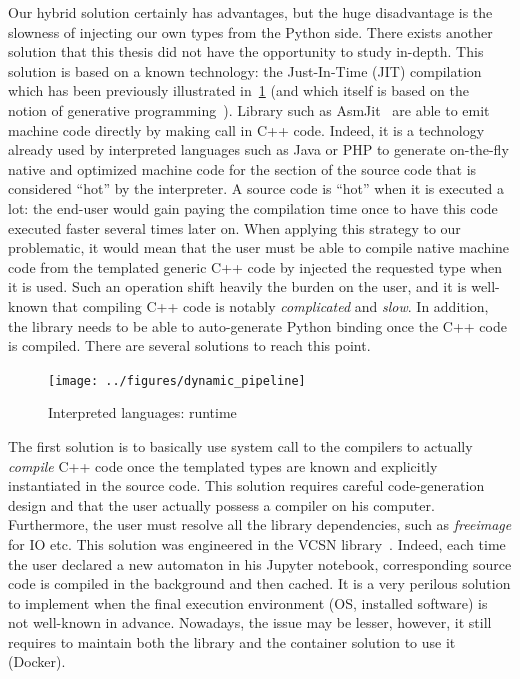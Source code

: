 Our hybrid solution certainly has advantages, but the huge disadvantage is the slowness of injecting our own types from
the Python side. There exists another solution that this thesis did not have the opportunity to study in-depth. This
solution is based on a known technology: the Just-In-Time (JIT) compilation which has been previously illustrated
in~\cref{summary:fig:static.dynamic.dynamic.pipeline} (and which itself is based on the notion of generative
programming~\parencite{czarnecki.2000.generative}). Library such as AsmJit~\parencite{kobalicek.2011.asmjit} are able to
emit machine code directly by making call in C++ code. Indeed, it is a technology already used by interpreted languages
such as Java or PHP to generate on-the-fly native and optimized machine code for the section of the source code that is
considered ``hot'' by the interpreter. A source code is ``hot'' when it is executed a lot: the end-user would gain
paying the compilation time once to have this code executed faster several times later on. When applying this strategy
to our problematic, it would mean that the user must be able to compile native machine code from the templated generic
C++ code by injected the requested type when it is used. Such an operation shift heavily the burden on the user, and it
is well-known that compiling C++ code is notably \emph{complicated} and \emph{slow}. In addition, the library needs to
be able to auto-generate Python binding once the C++ code is compiled. There are several solutions to reach this point.

\begin{figure}[htbp]
  \centering
  \texttt{[image: ../figures/dynamic\_pipeline]}
  \caption{Interpreted languages: runtime}
  \label{summary:fig:static.dynamic.dynamic.pipeline}
\end{figure}

The first solution is to basically use system call to the compilers to actually \emph{compile} C++ code once the
templated types are known and explicitly instantiated in the source code. This solution requires careful code-generation
design and that the user actually possess a compiler on his computer. Furthermore, the user must resolve all the
library dependencies, such as \emph{freeimage} for IO etc. This solution was engineered in the VCSN
library~\parencite{demaille.2013.vcsn}. Indeed, each time the user declared a new automaton in his Jupyter notebook,
corresponding source code is compiled in the background and then cached. It is a very perilous solution to implement
when the final execution environment (OS, installed software) is not well-known in advance. Nowadays, the issue may be
lesser, however, it still requires to maintain both the library and the container solution to use it (Docker).

